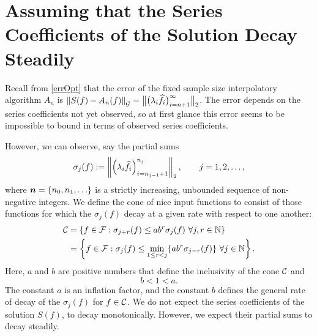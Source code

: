 \documentclass[final]{elsarticle}
\theoremstyle{definition}
\theoremstyle{remark}
\newcommand{\optAn}{A_n}
\begin{document}
\section{Assuming that the Series Coefficients of the Solution Decay \\ Steadily} \label{sec:cone}

Recall from \eqref{errOpt} that the error of the fixed sample size interpolatory algorithm $\optAn$ is $\norm[\cg]{S(f) - \optAn(f)} = \bignorm[2]{\bigl(\lambda_{i} \hf_{i} \bigr)_{i= n+1}^{\infty}}$.  The error depends on the series coefficients not yet observed, so at first glance this error seems to be impossible to bound in terms of observed series coefficients.  

However, we can observe, say the partial sums 
\begin{equation} \label{sumdef}
\sigma_j(f) :
= \norm[2]{ \left(\lambda_{i} \hf_{i} \right)_{i=n_{j-1}+1}^{n_j}}, \qquad j=1, 2, \ldots,
\end{equation}
where $\vn  = \{n_0, n_1, \ldots\}$ is a strictly increasing, unbounded sequence of non-negative integers.  We define the cone of nice input functions to consist of those functions for which the $\sigma_j(f)$ decay at a given rate with respect to one another:
\begin{align} \label{decayconedef}
\cc &= \left\{ f \in \cf : \sigma_{j+r}(f) \le ab^r \sigma_j (f) \ \forall j,r \in \naturals \right\} \\
\nonumber
& = \left\{ f \in \cf : \sigma_j(f) \le \min_{1 \le r < j}\{ab^r\sigma_{j-r}(f)\} \ \forall j \in \naturals \right\}.
\end{align}
Here, $a$ and $b$ are positive numbers that define the inclusivity of the cone $\cc$ and 
\begin{equation} \label{abcond}
b <1 < a.
\end{equation}
The constant $a$ is an inflation factor, and the constant $b$ defines the general rate of decay of the $\sigma_j(f)$ for $f \in \cc$. We do not expect the series coefficients of the solution $S(f)$, to decay monotonically. However, we expect their partial sums to decay steadily.
\end{document}
